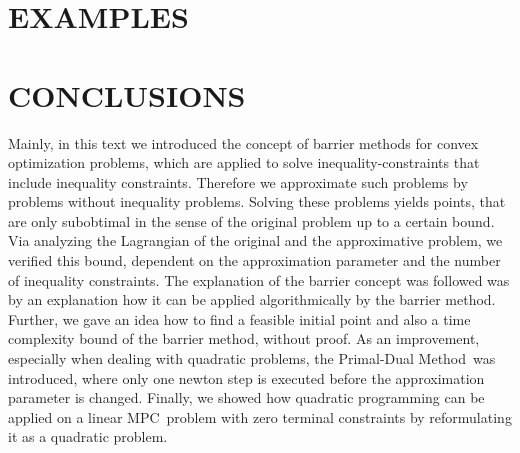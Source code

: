 \documentclass[a4paper, 10pt, conference]{ieeeconf}      %
\newcommand{\pdm}{Primal-Dual Method}
\newcommand{\mpc}{MPC}
\begin{document}
\section{EXAMPLES}


\section{CONCLUSIONS}
Mainly, in this text we introduced the concept of barrier methods for convex optimization problems, which are applied to solve inequality-constraints that include inequality constraints. Therefore we approximate such problems by problems without inequality problems. Solving these problems yields points, that are only subobtimal in the sense of the original problem up to a certain bound. Via analyzing the Lagrangian of the original and the approximative problem, we verified this bound, dependent on the approximation parameter and the number of inequality constraints. The explanation of the barrier concept was followed was by an explanation how it can be applied algorithmically by the barrier method. Further, we gave an idea how to find a feasible initial point and also a time complexity bound of the barrier method, without proof. As an improvement, especially when dealing with quadratic problems, the \pdm \ was introduced, where only one newton step is executed before the approximation parameter is changed. Finally, we showed how quadratic programming can be applied on a linear \mpc \ problem with zero terminal constraints by reformulating it as a quadratic problem.

\newpage


\end{document}
